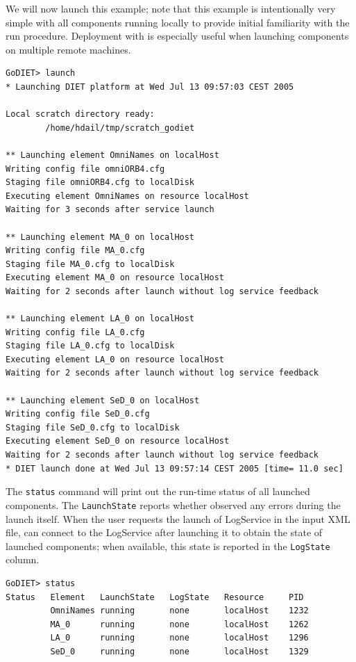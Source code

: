 We will now launch this example; note that this example is intentionally very
simple with all components running locally to provide initial familiarity with
the \godiet run procedure. Deployment with \godiet is especially useful  when
launching components on multiple remote machines.

\begin{verbatim}
GoDIET> launch
* Launching DIET platform at Wed Jul 13 09:57:03 CEST 2005

Local scratch directory ready:
        /home/hdail/tmp/scratch_godiet

** Launching element OmniNames on localHost
Writing config file omniORB4.cfg
Staging file omniORB4.cfg to localDisk
Executing element OmniNames on resource localHost
Waiting for 3 seconds after service launch

** Launching element MA_0 on localHost
Writing config file MA_0.cfg
Staging file MA_0.cfg to localDisk
Executing element MA_0 on resource localHost
Waiting for 2 seconds after launch without log service feedback

** Launching element LA_0 on localHost
Writing config file LA_0.cfg
Staging file LA_0.cfg to localDisk
Executing element LA_0 on resource localHost
Waiting for 2 seconds after launch without log service feedback

** Launching element SeD_0 on localHost
Writing config file SeD_0.cfg
Staging file SeD_0.cfg to localDisk
Executing element SeD_0 on resource localHost
Waiting for 2 seconds after launch without log service feedback
* DIET launch done at Wed Jul 13 09:57:14 CEST 2005 [time= 11.0 sec]
\end{verbatim}

The \texttt{status} command will print out the run-time status of all launched
components. The \texttt{LaunchState} reports whether \godiet observed any
errors during the launch itself. When the user requests the launch of
LogService in the input XML file, \godiet can connect to the LogService  after
launching it to obtain the state of launched components; when available, this
state is reported in the \texttt{LogState} column.

\begin{verbatim}
GoDIET> status
Status   Element   LaunchState   LogState   Resource     PID
         OmniNames running       none       localHost    1232
         MA_0      running       none       localHost    1262
         LA_0      running       none       localHost    1296
         SeD_0     running       none       localHost    1329
\end{verbatim}

